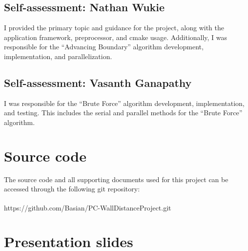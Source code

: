 \documentclass[]{aiaa-tc}%
\begin{document}
\subsection{Self-assessment: Nathan Wukie}
I provided the primary topic and guidance for the project, along with
the application framework, preprocessor, and cmake
usage. Additionally, I was responsible for the ``Advancing Boundary''
algorithm development, implementation, and parallelization.

\subsection{Self-assessment: Vasanth Ganapathy}
I was responsible for the “Brute Force” algorithm development,
implementation, and testing.  This includes the serial and parallel
methods for the “Brute Force” algorithm.  





\nocite{*}




\clearpage
\begin{appendices}
  \section{Source code}
  \noindent
  The source code and all supporting documents used for this project
  can be accessed through the following git repository:
  \\\\
  \noindent
  https://github.com/Basian/PC-WallDistanceProject.git

  \section{Presentation slides}
  

\end{appendices}
\end{document}
